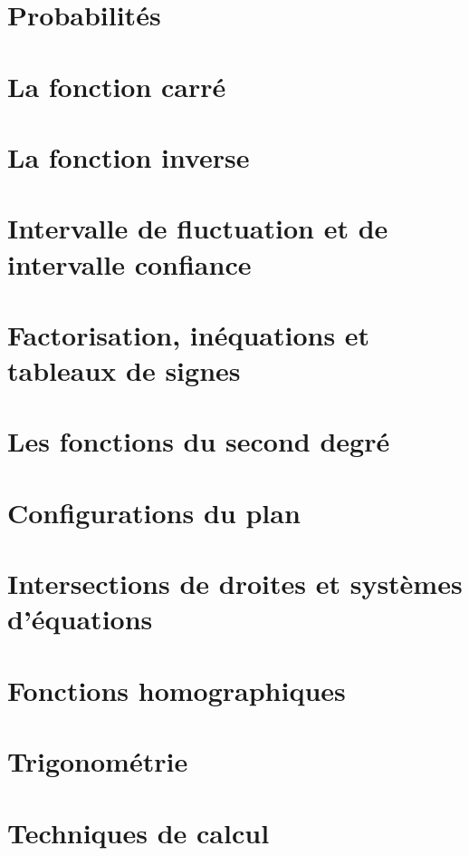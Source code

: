 \documentclass[a4paper,12pt]{book}
\begin{document}
\chapter{Probabilités}


\chapter{La fonction carré}


\chapter{La fonction inverse}


\chapter{Intervalle de fluctuation et de intervalle confiance}


\chapter{Factorisation, inéquations et tableaux de signes}


\chapter{Les fonctions du second degré}


\chapter{Configurations du plan}


\chapter{Intersections de droites et systèmes d'équations}


\chapter{Fonctions homographiques}


\chapter{Trigonométrie}


\chapter{Techniques de calcul}

\end{document}
